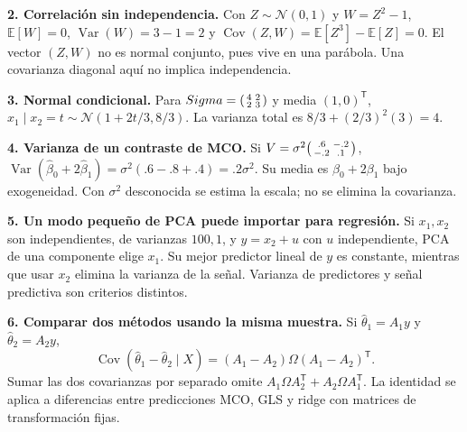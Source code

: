 \documentclass[11pt,a4paper]{article}
\newcommand{\E}{\mathbb E}
\newcommand{\T}{^{\mathsf T}}
\DeclareMathOperator{\Var}{Var}
\DeclareMathOperator{\Cov}{Cov}
\newcommand{\Normal}{\mathcal N}
\theoremstyle{definition}\newtheorem{definicion}[teorema]{Definición}
\begin{document}
\textbf{2. Correlación sin independencia.}
Con $Z\sim\Normal(0,1)$ y $W=Z^2-1$,
$\E[W]=0$, $\Var(W)=3-1=2$ y $\Cov(Z,W)=\E[Z^3]-\E[Z]=0$.
El vector $(Z,W)$ no es normal conjunto, pues vive en una parábola.
Una covarianza diagonal aquí no implica independencia.

\textbf{3. Normal condicional.}
Para $\Sigma=\begin{psmallmatrix}4&2\\2&3\end{psmallmatrix}$ y media
$(1,0)\T$,
$x_1\mid x_2=t\sim\Normal(1+2t/3,8/3)$.
La varianza total es $8/3+(2/3)^2(3)=4$.

\textbf{4. Varianza de un contraste de MCO.}
Si $V=\sigma^2\begin{psmallmatrix}.6&-.2\\-.2&.1\end{psmallmatrix}$,
$\Var(\widehat\beta_0+2\widehat\beta_1)=
\sigma^2(.6-.8+.4)=.2\sigma^2$.
Su media es $\beta_0+2\beta_1$ bajo exogeneidad.
Con $\sigma^2$ desconocida se estima la escala; no se elimina la covarianza.

\textbf{5. Un modo pequeño de PCA puede importar para regresión.}
Si $x_1,x_2$ son independientes, de varianzas $100,1$, y
$y=x_2+u$ con $u$ independiente, PCA de una componente elige $x_1$.
Su mejor predictor lineal de $y$ es constante, mientras que usar $x_2$
elimina la varianza de la señal. Varianza de predictores y señal predictiva
son criterios distintos.

\textbf{6. Comparar dos métodos usando la misma muestra.}
Si $\widehat\theta_1=A_1y$ y $\widehat\theta_2=A_2y$,
\[
\Cov(\widehat\theta_1-\widehat\theta_2\mid X)
=(A_1-A_2)\Omega(A_1-A_2)\T.
\]
Sumar las dos covarianzas por separado omite
$A_1\Omega A_2\T+A_2\Omega A_1\T$.
La identidad se aplica a diferencias entre predicciones MCO, GLS y ridge
con matrices de transformación fijas.
\end{document}
